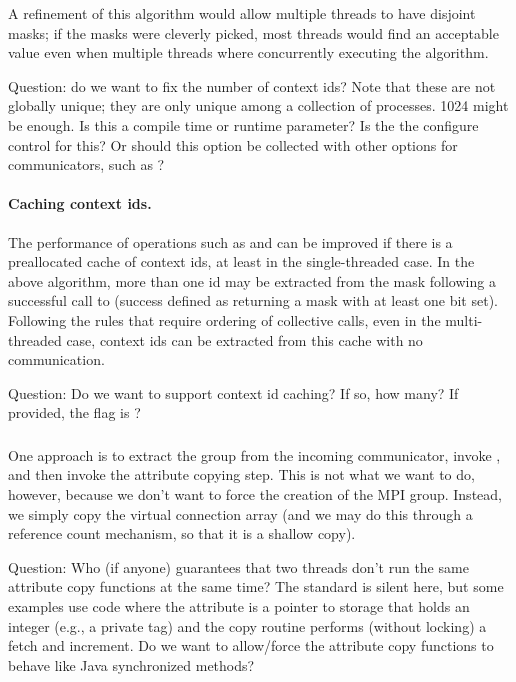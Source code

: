 \documentclass{article}
\begin{document}
A refinement of this algorithm would allow multiple threads to have
disjoint masks; if the masks were cleverly picked, most threads would
find an acceptable value even when multiple threads where concurrently
executing the algorithm.

Question: do we want to fix the number of context ids?  Note that
these are not globally unique; they are only unique among a collection
of processes.  1024 might be enough.  Is this a compile time or
runtime parameter?  Is the  the configure
control for this?  Or should this option be collected with other
options for communicators, such as
?

\paragraph{Caching context ids.} 
The performance of operations such as  and
 can be improved if there is a preallocated cache of
context ids, at least in the single-threaded case.  In the above
algorithm, more than one id may be extracted from the mask following a
successful call to  (success defined as
returning a mask with at least one bit set).  Following the rules that
require ordering of collective calls, even in the multi-threaded case,
context ids can be extracted from this cache with no communication.

Question: Do we want to support context id caching?  If so, how many?
If provided, the  flag is
? 

\subsubsection{}
One approach is to extract the group from the incoming communicator,
invoke , and then invoke the attribute
copying step.  This is not what we want to do, however, because we
don't want to force the creation of the MPI group.  Instead, we simply
copy the virtual connection array (and we may do this through a
reference count mechanism, so that it is a shallow copy).

Question: Who (if anyone) guarantees that two threads don't run the same
attribute copy functions at the same time?  The standard is silent here, but
some examples use code where the attribute is a pointer to storage that holds
an integer (e.g., a private tag) and the copy routine performs (without
locking) a fetch and increment.  Do we want to allow/force the attribute copy
functions to behave like Java synchronized methods?
\end{document}
